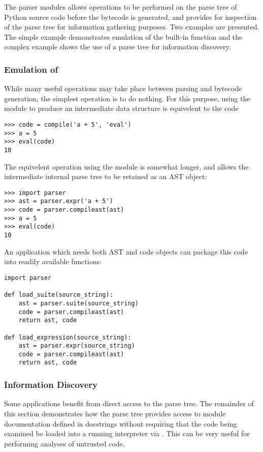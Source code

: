 The parser modules allows operations to be performed on the parse tree
of Python source code before the bytecode is generated, and provides
for inspection of the parse tree for information gathering purposes.
Two examples are presented.  The simple example demonstrates emulation
of the  built-in function and the complex example
shows the use of a parse tree for information discovery.

\subsubsection{Emulation of }

While many useful operations may take place between parsing and
bytecode generation, the simplest operation is to do nothing.  For
this purpose, using the  module to produce an
intermediate data structure is equivelent to the code

\bcode\begin{verbatim}
>>> code = compile('a + 5', 'eval')
>>> a = 5
>>> eval(code)
10
\end{verbatim}\ecode
%
The equivelent operation using the  module is somewhat
longer, and allows the intermediate internal parse tree to be retained
as an AST object:

\bcode\begin{verbatim}
>>> import parser
>>> ast = parser.expr('a + 5')
>>> code = parser.compileast(ast)
>>> a = 5
>>> eval(code)
10
\end{verbatim}\ecode
%
An application which needs both AST and code objects can package this
code into readily available functions:

\bcode\begin{verbatim}
import parser

def load_suite(source_string):
    ast = parser.suite(source_string)
    code = parser.compileast(ast)
    return ast, code

def load_expression(source_string):
    ast = parser.expr(source_string)
    code = parser.compileast(ast)
    return ast, code
\end{verbatim}\ecode
%
\subsubsection{Information Discovery}

Some applications benefit from direct access to the parse tree.  The
remainder of this section demonstrates how the parse tree provides
access to module documentation defined in docstrings without requiring
that the code being examined be loaded into a running interpreter via
.  This can be very useful for performing analyses of
untrusted code.

